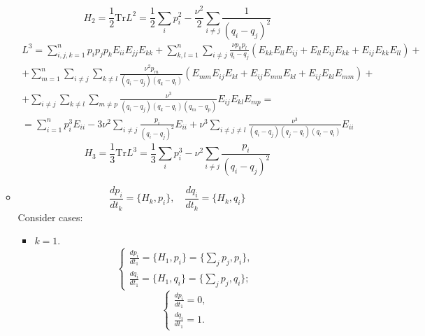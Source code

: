 \documentclass[12pt]{article}
\theoremstyle{definition}
\begin{document}
\begin{enumerate}
\begin{itemize}
        \begin{equation}
            \boxed{H_2=\frac{1}{2}\text{Tr}L^2=\frac{1}{2}\sum\limits_ip_i^2-\frac{\nu^2}{2}\sum\limits_{i\neq j}\frac{1}{(q_i-q_j)^2}}
        \end{equation}
        \begin{multline}
            L^3=\sum_{i,j,k=1}^np_ip_jp_kE_{ii}E_{jj}E_{kk}+\sum\limits_{k,l=1}^n\sum\limits_{i\neq j}\frac{\nu p_kp_l}{q_i-q_j}(E_{kk}E_{ll}E_{ij}+E_{ll}E_{ij}E_{kk}+E_{ij}E_{kk}E_{ll})+\\+\sum\limits_{m=1}^n\sum\limits_{i\neq j}\sum\limits_{k\neq l}\frac{\nu^2p_m}{(q_i-q_j)(q_k-q_l)}(E_{mm}E_{ij}E_{kl}+E_{ij}E_{mm}E_{kl}+E_{ij}E_{kl}E_{mm})+\\+\sum\limits_{i\neq j}\sum\limits_{k\neq l}\sum\limits_{m\neq p}\frac{\nu^3}{(q_i-q_j)(q_k-q_l)(q_m-q_p)}E_{ij}E_{kl}E_{mp}=\\=\sum_{i=1}^np^3_iE_{ii}-3\nu^2\sum\limits_{i\neq j}\frac{p_i}{(q_i-q_j)^2}E_{ii}+\nu^3\sum\limits_{i\neq j\neq l}\frac{\nu^3}{(q_i-q_j)(q_j-q_l)(q_l-q_i)}E_{ii}
        \end{multline}
        \begin{equation}
            \boxed{H_3=\frac{1}{3}\text{Tr}L^3=\frac{1}{3}\sum\limits_ip_i^3-\nu^2\sum\limits_{i\neq j}\frac{p_i}{(q_i-q_j)^2}}
        \end{equation}
        \item 
        \begin{equation}
            \frac{dp_i}{dt_k}=\{H_k, p_i\},\quad \frac{dq_i}{dt_k}=\{H_k,q_i\}
        \end{equation}
        Consider cases:
        \begin{itemize}
            \item $k=1$.
            \begin{equation}
                \begin{cases}
                    \frac{dp_i}{dt_1}=\{H_1,p_i\}=\{\sum\limits_jp_j,p_i\},\\
                    \frac{dq_i}{dt_1}=\{H_1,q_i\}=\{\sum\limits_jp_j,q_i\};
                \end{cases}
            \end{equation}
            \begin{equation}
                \boxed{\begin{cases}
                    \frac{dp_i}{dt_1}=0,\\
                    \frac{dq_i}{dt_1}=1.
                \end{cases}}

\end{equation}
\end{itemize}
\end{itemize}
\end{enumerate}
\end{document}

